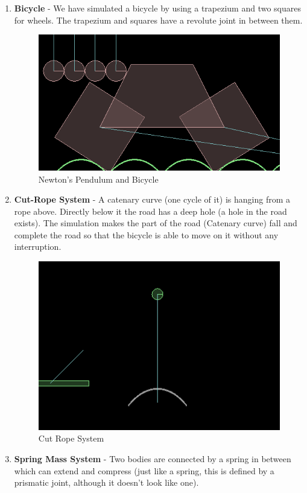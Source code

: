 \documentclass[12pt, a4paper]{article}
\begin{document}
\begin{enumerate}
\begin{figure}[H]
\end{figure}
\item \textbf{Bicycle} - We have simulated a bicycle by using a trapezium and two squares for wheels. The trapezium and squares have a revolute joint in between them.
\begin{figure}[H]
\caption{Newton's Pendulum and Bicycle}
\centering
\includegraphics[scale=0.3]{pendulum.png}
\end{figure}
\item \textbf{Cut-Rope System} - A catenary curve (one cycle of it) is hanging from a rope above. Directly below it the road has a deep hole (a hole in the road exists). The simulation makes the part of the road (Catenary curve) fall and complete the road so that the bicycle is able to move on it without any interruption.
\begin{figure}[H]
\caption{Cut Rope System}
\centering
\includegraphics[scale=0.30]{path.png}
\end{figure}
\item \textbf{Spring Mass System} - Two bodies are connected by a spring in between which can extend and compress (just like a spring, this is defined by a prismatic joint, although it doesn't look like one).

\end{enumerate}
\end{document}
